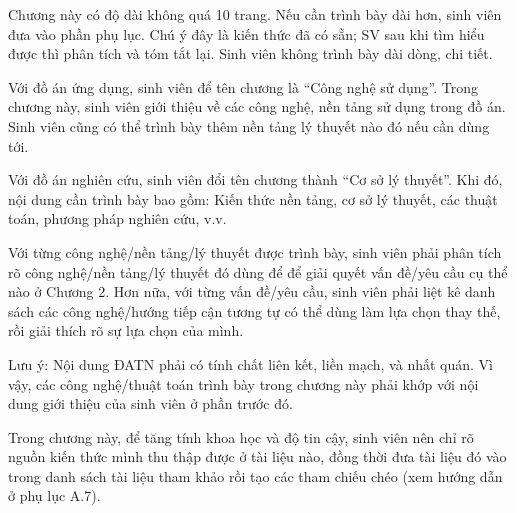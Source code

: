 \documentclass[../DoAn.tex]{subfiles}
\begin{document}
Chương này có độ dài không quá 10 trang. Nếu cần trình bày dài hơn, sinh viên đưa vào phần phụ lục. Chú ý đây là kiến thức đã có sẵn; SV sau khi tìm hiểu được thì phân tích và tóm tắt lại. Sinh viên không trình bày dài dòng, chi tiết. 

Với đồ án ứng dụng, sinh viên để tên chương là “Công nghệ sử dụng”. Trong chương này, sinh viên giới thiệu về các công nghệ, nền tảng sử dụng trong đồ án. Sinh viên cũng có thể trình bày thêm nền tảng lý thuyết nào đó nếu cần dùng tới.

Với đồ án nghiên cứu, sinh viên đổi tên chương thành “Cơ sở lý thuyết”. Khi đó, nội dung cần trình bày bao gồm: Kiến thức nền tảng, cơ sở lý thuyết, các thuật toán, phương pháp nghiên cứu, v.v.

Với từng công nghệ/nền tảng/lý thuyết được trình bày, sinh viên phải phân tích rõ công nghệ/nền tảng/lý thuyết đó dùng để để giải quyết vấn đề/yêu cầu cụ thể nào ở Chương 2. Hơn nữa, với từng vấn đề/yêu cầu, sinh viên phải liệt kê danh sách các công nghệ/hướng tiếp cận tương tự có thể dùng làm lựa chọn thay thế, rồi giải thích rõ sự lựa chọn của mình.

Lưu ý: Nội dung ĐATN phải có tính chất liên kết, liền mạch, và nhất quán. Vì vậy, các công nghệ/thuật toán trình bày trong chương này phải khớp với nội dung giới thiệu của sinh viên ở phần trước đó. 

Trong chương này, để tăng tính khoa học và độ tin cậy, sinh viên nên chỉ rõ nguồn kiến thức mình thu thập được ở tài liệu nào, đồng thời đưa tài liệu đó vào trong danh sách tài liệu tham khảo rồi tạo các tham chiếu chéo (xem hướng dẫn ở phụ lục A.7).
\end{document}
